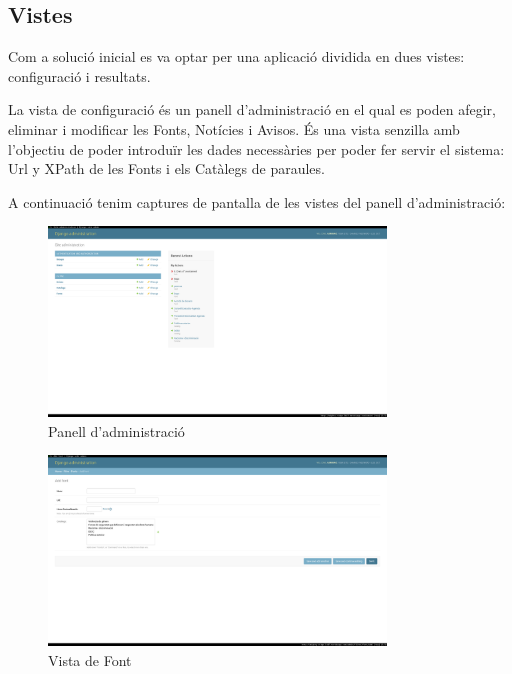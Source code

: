 \documentclass{article}
\begin{document}
\newpage

\subsection{Vistes}

Com a solució inicial es va optar per una aplicació dividida en dues vistes: configuració i resultats.

La vista de configuració és un panell d'administració en el qual es poden afegir, eliminar i modificar les Fonts, Notícies i Avisos. És una vista senzilla amb l'objectiu de poder introduïr les dades necessàries per poder fer servir el sistema: Url y XPath de les Fonts i els Catàlegs de paraules.

A continuació tenim captures de pantalla de les vistes del panell d'administració:

\begin{figure}[!ht]
    \centering
    \includegraphics[width=0.8\textwidth]{adminpanel.png}
    \caption{Panell d'administració}
\end{figure}

\begin{figure}[!ht]
    \centering
    \includegraphics[width=0.8\textwidth]{addfont.png}
    \caption{Vista de Font}
\end{figure}

\newpage
\end{document}
